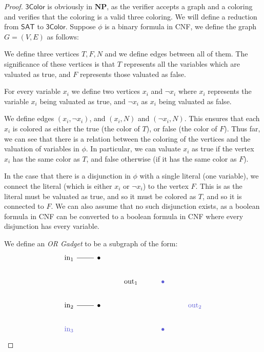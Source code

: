 \documentclass[10pt]{article}
\def\sat{\mathsf{SAT}}
\def\threecolor{\mathsf{3Color}}
\def\NP{\mathbf{NP}}
\begin{document}
\begin{proof}
    $\threecolor$ is obviously in $\NP$, as the verifier accepts a graph and a coloring and verifies that the coloring is a valid three coloring.
    We will define a reduction from $\sat$ to $\threecolor$.
    Suppose $\phi$ is a binary formula in CNF, we define the graph $G=(V,E)$ as follows:
    \benum
        \item We define three vertices $T,F,N$ and we define edges between all of them.
        The significance of these vertices is that $T$ represents all the variables which are valuated as true, and $F$ represents those valuated as false.
        \item For every variable $x_i$ we define two vertices $x_i$ and $\neg x_i$ where $x_i$ represents the variable $x_i$ being valuated as true, and $\neg x_i$ as $x_i$ being valuated as false.
        \item We define edges $(x_i,\neg x_i)$, and $(x_i,N)$ and $(\neg x_i,N)$.
        This ensures that each $x_i$ is colored as either the true (the color of $T$), or false (the color of $F$).
        \btext Thus far, we can see that there is a relation between the coloring of the vertices and the valuation of variables in $\phi$.
        In particular, we can valuate $x_i$ as true if the vertex $x_i$ has the same color as $T$, and false otherwise (if it has the same color as $F$).
        \item In the case that there is a disjunction in $\phi$ with a single literal (one variable), we connect the literal (which is either $x_i$ or $\neg x_i$) to the vertex $F$.
        This is as the literal must be valuated as true, and so it must be colored as $T$, and so it is connected to $F$.
        We can also assume that no such disjunction exists, as a boolean formula in CNF can be converted to a boolean formula in CNF where every disjunction has every variable.
        \item We define an \emph{OR Gadget} to be a subgraph of the form:
        \[\begin{tikzcd}
        	{\mathrm{in}_1} & \bullet \\
        	&& {\mathrm{out}_1} & \textcolor{rgb,255:red,92;green,92;blue,214}{\bullet} \\
        	{\mathrm{in}_2} & \bullet &&& \textcolor{rgb,255:red,92;green,92;blue,214}{\mathrm{out}_2} \\
        	\textcolor{rgb,255:red,92;green,92;blue,214}{\mathrm{in}_3} &&& \textcolor{rgb,255:red,92;green,92;blue,214}{\bullet}
        	\arrow[no head, from=1-1, to=1-2]
        	\arrow[no head, from=3-1, to=3-2]

\end{tikzcd}\]
\end{proof}
\end{document}
